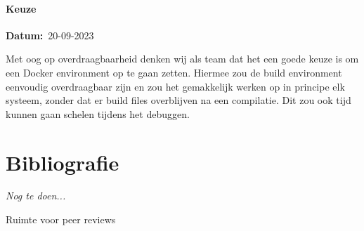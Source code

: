 \documentclass[a4paper]{report}
\newcommand{\timestamp}[1]{
  \mbox{\scriptsize \textbf{Datum:} #1} \smallbreak
}
\begin{document}
\subsubsection{Keuze}
\timestamp{20-09-2023}
Met oog op overdraagbaarheid denken wij als team dat het een goede keuze is om een Docker environment op te gaan zetten. 
Hiermee zou de build environment eenvoudig overdraagbaar zijn en zou het gemakkelijk werken op in principe elk systeem, zonder dat er build files overblijven na een compilatie.
Dit zou ook tijd kunnen gaan schelen tijdens het debuggen. 




\chapter{Bibliografie}
\textit{Nog te doen...}
\begingroup
\renewcommand{\chapter}[2]{} %
\renewcommand{\addcontentsline}[3]{} %


\endgroup

\chapter{Bijlagen}
\textit{Ruimte voor peer reviews}
\end{document}
